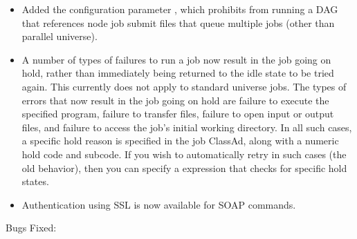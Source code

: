 \begin{itemize}
\item Added the  configuration parameter
, which prohibits 
from running a DAG that references node job submit files that
queue multiple jobs (other than parallel universe).

\item A number of types of failures to run a job now result in the job
going on hold, rather than immediately being returned to the idle
state to be tried again.  This currently does not apply to
standard universe jobs.  The types of errors that now result in the
job going on hold are failure to execute the specified program,
failure to transfer files, failure to open input or output files,
and failure to access the job's initial working directory.
In all such cases, a specific hold reason is specified in the job
ClassAd, along with a numeric hold code and subcode.  If you wish to
automatically retry in such cases (the old behavior), then you can
specify a  expression that checks for
specific hold states.

\item Authentication using SSL is now available for SOAP commands.

\end{itemize}

\noindent Bugs Fixed:


